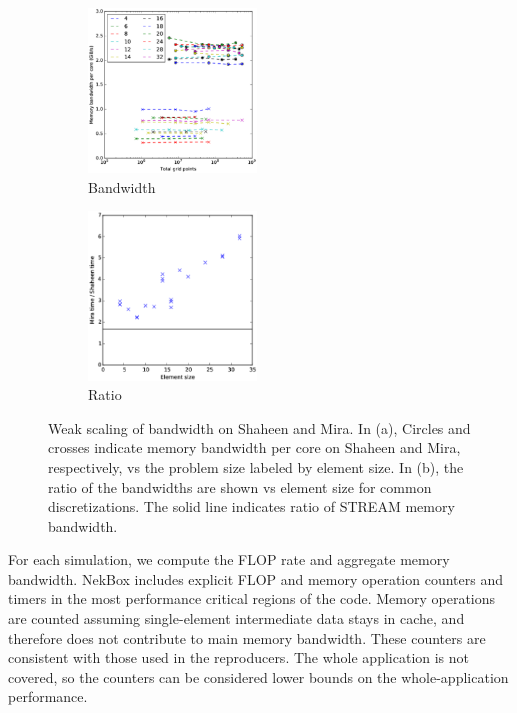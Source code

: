 \begin{figure}
\begin{subfigure}[t]{0.49\textwidth}
\includegraphics[width=0.49\textwidth]{gfx/combined-bw}
\caption{Bandwidth}
\end{subfigure}
\begin{subfigure}[t]{0.49\textwidth}
\includegraphics[width=0.49\textwidth]{gfx/mira_vs_haswell}
\caption{Ratio}
\end{subfigure}
\caption{ 
Weak scaling of bandwidth on Shaheen and Mira.
In (a), Circles and crosses indicate memory bandwidth per core on Shaheen and Mira, respectively, vs the problem size labeled by element size.
In (b), the ratio of the bandwidths are shown vs element size for common discretizations.
The solid line indicates ratio of STREAM memory bandwidth.
}

\end{figure}

For each simulation, we compute the FLOP rate and aggregate memory bandwidth.
NekBox includes explicit FLOP and memory operation counters and timers in the most performance critical regions of the code.
Memory operations are counted assuming single-element intermediate data stays in cache, and therefore does not contribute to main memory bandwidth.
These counters are consistent with those used in the reproducers.
The whole application is not covered, so the counters can be considered lower bounds on the whole-application performance.

